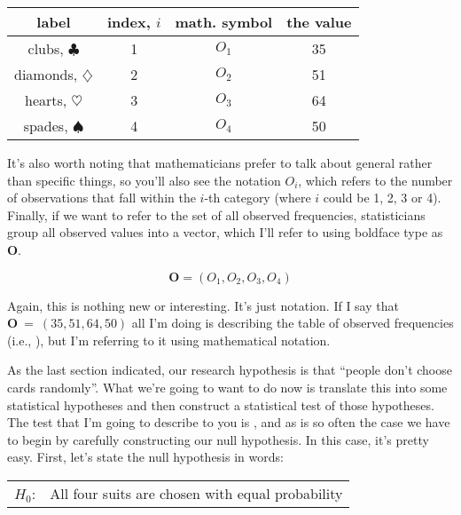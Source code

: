 \begin{center}
\begin{tabular}{cc|cc}
label &  index, $i$  & math. symbol &  the value \\  \hline
 clubs, $\clubsuit$ 	& 1 	& $O_1$ & 35 \\
 diamonds, $\diamondsuit$ & 2& $O_2$ & 51 \\
 hearts, $\heartsuit$	&3	& $O_3$ & 64 \\
 spades, $\spadesuit$ &4		& $O_4$ & 50 \\
\end{tabular}
\end{center}

\noindent
It's also worth noting that mathematicians prefer to talk about general rather than specific things, so you'll also see the notation $O_i$, which refers to the number of observations that fall within the $i$-th category (where $i$ could be 1, 2, 3 or 4). Finally, if we want to refer to the set of all observed frequencies, statisticians group all observed values into a vector, which I'll refer to using boldface type as $\bm{O}$. 

$$
\bm{O} = (O_1, O_2, O_3, O_4)
$$

Again, this is nothing new or interesting. It's just notation. If I say that $\bm{O}~=~(35, 51, 64, 50)$ all I'm doing is describing the table of observed frequencies (i.e., ), but I'm referring to it using mathematical notation. 


As the last section indicated, our research hypothesis is that ``people don't choose cards randomly''. What we're going to want to do now is translate this into some statistical hypotheses and then construct a statistical test of those hypotheses. The test that I'm going to describe to you is , and as is so often the case we have to begin by carefully constructing our null hypothesis. In this case, it's pretty easy. First, let's state the null hypothesis in words:

\smallskip
\begin{tabular}{ll}
$H_0$: \hspace*{0.5cm} & All four suits are chosen with equal probability
\end{tabular} 
\smallskip

